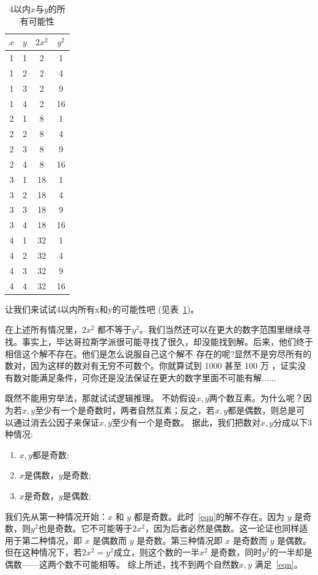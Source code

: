 \begin{table}[htbp]
\centering
\caption{4以内$x$与$y$的所有可能性}
\begin{tabular}{|c|c|c|c|}
\hline
$x$ & $y$ & $2x^2$ & $y^2$ \\
\hline
1 & 1 & 2 & 1 \\
\hline
1 & 2 & 2 & 4 \\
\hline
1 & 3 & 2 & 9 \\
\hline
1 & 4 & 2 & 16 \\
\hline
2 & 1 & 8 & 1 \\
\hline
2 & 2 & 8 & 4 \\
\hline
2 & 3 & 8 & 9 \\
\hline
2 & 4 & 8 & 16 \\
\hline
3 & 1 & 18 & 1 \\
\hline
3 & 2 & 18 & 4 \\
\hline
3 & 3 & 18 & 9 \\
\hline
3 & 4 & 18 & 16 \\
\hline
4 & 1 & 32 & 1 \\
\hline
4 & 2 & 32 & 4 \\
\hline
4 & 3 & 32 & 9 \\
\hline
4 & 4 & 32 & 16 \\
\hline
\end{tabular}
\label{tab:example}
\end{table}
让我们来试试4以内所有x和y的可能性吧 (见表~\ref{tab:example})。

在上述所有情况里，$2x^2$ 都不等于$y^2$。我们当然还可以在更大的数字范围里继续寻找。事实上，毕达哥拉斯学派很可能寻找了很久，却没能找到解。后来，他们终于相信这个解不存在。他们是怎么说服自己这个解不 存在的呢?显然不是穷尽所有的数对，因为这样的数对有无穷不可数个。你就算试到 1000 甚至 100 万 ，证实没有数对能满足条件，可你还是没法保证在更大的数字里面不可能有解......

既然不能用穷举法，那就试试逻辑推理。 
不妨假设$x,y$两个数互素。为什么呢？因为若$x,y$至少有一个是奇数时，两者自然互素；反之，若$x,y$都是偶数，则总是可以通过消去公因子来保证$x,y$至少有一个是奇数。
据此，我们把数对$x,y$分成以下3种情况: 
\begin{enumerate}
\item $x,y$都是奇数;
\item $x$是偶数，$y$是奇数;
\item $x$是奇数，$y$是偶数;
\end{enumerate}

我们先从第一种情况开始：$x$ 和 $y$ 都是奇数。此时~\eqref{eqn}的解不存在。因为 $y$ 是奇数，则$y^2$也是奇数。它不可能等于$2x^2$，因为后者必然是偶数。这一论证也同样适用于第二种情况，即 $x$ 是偶数而 $y$ 是奇数。第三种情况即 $x$ 是奇数而 $y$ 是偶数。但在这种情况下，若$2x^2=y^2$成立，则这个数的一半$x^2$ 是奇数，同时$y^2$的一半却是偶数——这两个数不可能相等。
综上所述，找不到两个自然数$x,y$ 满足~\eqref{eqn}。


